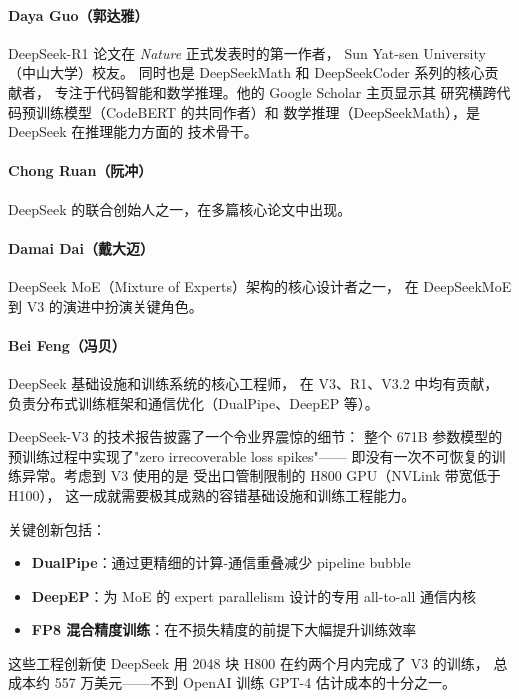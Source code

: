 \paragraph{Daya Guo（郭达雅）}
DeepSeek-R1 论文在 \textit{Nature} 正式发表时的第一作者，
Sun Yat-sen University（中山大学）校友。
同时也是 DeepSeekMath 和 DeepSeekCoder 系列的核心贡献者，
专注于代码智能和数学推理。他的 Google Scholar 主页显示其
研究横跨代码预训练模型（CodeBERT 的共同作者）和
数学推理（DeepSeekMath），是 DeepSeek 在推理能力方面的
技术骨干。

\paragraph{Chong Ruan（阮冲）}
DeepSeek 的联合创始人之一，在多篇核心论文中出现。

\paragraph{Damai Dai（戴大迈）}
DeepSeek MoE（Mixture of Experts）架构的核心设计者之一，
在 DeepSeekMoE 到 V3 的演进中扮演关键角色。

\paragraph{Bei Feng（冯贝）}
DeepSeek 基础设施和训练系统的核心工程师，
在 V3、R1、V3.2 中均有贡献，
负责分布式训练框架和通信优化（DualPipe、DeepEP 等）。

\begin{corebox}
DeepSeek-V3 的技术报告披露了一个令业界震惊的细节：
整个 671B 参数模型的预训练过程中实现了"zero irrecoverable loss spikes"——
即没有一次不可恢复的训练异常。考虑到 V3 使用的是
受出口管制限制的 H800 GPU（NVLink 带宽低于 H100），
这一成就需要极其成熟的容错基础设施和训练工程能力。

关键创新包括：
\begin{itemize}[noitemsep]
  \item \textbf{DualPipe}：通过更精细的计算-通信重叠减少 pipeline bubble
  \item \textbf{DeepEP}：为 MoE 的 expert parallelism 设计的专用 all-to-all 通信内核
  \item \textbf{FP8 混合精度训练}：在不损失精度的前提下大幅提升训练效率
\end{itemize}

这些工程创新使 DeepSeek 用 2048 块 H800 在约两个月内完成了 V3 的训练，
总成本约 557 万美元——不到 OpenAI 训练 GPT-4 估计成本的十分之一。
\end{corebox}

